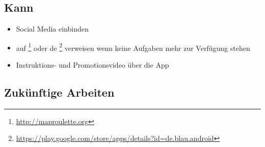 \subsection{Kann}
\begin{itemize}
	\item Social Media einbinden
	\item auf \footnote{\url{http://maproulette.org}} oder de \footnote{\url{https://play.google.com/store/apps/details?id=de.blau.android}} verweisen wenn keine Aufgaben mehr zur Verfügung stehen
	\item Instruktions- und Promotionsvideo über die App
\end{itemize}

\subsection{Zukünftige Arbeiten}
